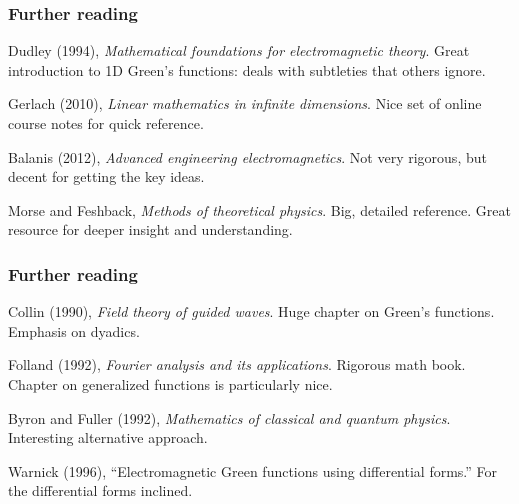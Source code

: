 \documentclass[12 pt, compress, handout, intlimits]{beamer}
\begin{document}
\note{}

\begin{frame}[fragile]
    \frametitle{Further reading}

    Dudley (1994), \emph{Mathematical foundations for electromagnetic theory}.
    Great introduction to 1D Green's functions: deals with subtleties that others ignore.

    Gerlach (2010), \emph{Linear mathematics in infinite dimensions}.
    Nice set of online course notes for quick reference.
 
    Balanis (2012), \emph{Advanced engineering electromagnetics}. 
    Not very rigorous, but decent for getting the key ideas.

    Morse and Feshback, \emph{Methods of theoretical physics}.
    Big, detailed reference. 
    Great resource for deeper insight and understanding.
  
\end{frame}

\note{}

\begin{frame}[fragile]
    \frametitle{Further reading}
    Collin (1990), \emph{Field theory of guided waves}. 
    Huge chapter on Green's functions. 
    Emphasis on dyadics.

    Folland (1992), \emph{Fourier analysis and its applications}. 
    Rigorous math book. 
    Chapter on generalized functions is particularly nice.

    Byron and Fuller (1992), \emph{Mathematics of classical and quantum physics}.
    Interesting alternative approach.

    Warnick (1996), ``Electromagnetic Green functions using differential forms.''
    For the differential forms inclined.

\end{frame}    

\note{}
\end{document}
